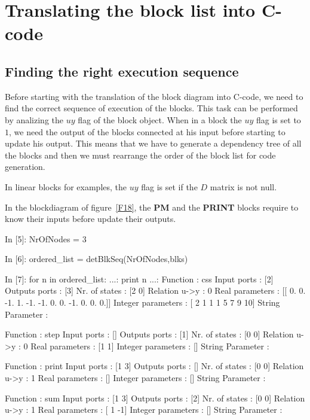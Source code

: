 \section{Translating the block list into C-code}
\subsection{Finding the right execution sequence}
Before starting with the translation of the block diagram into C-code, we need 
to find the correct sequence of execution of the blocks. This task can be 
performed by analizing the $uy$ flag of the block object. 
When in a block the $uy$ flag is set to $1$, we need the output of the blocks 
connected at his input before starting to update his output.
This means that we have to generate a dependency tree of all the blocks and 
then we must rearrange the order of the block list for code generation.

In linear blocks for examples, the $uy$ flag is set if the $D$ matrix is not 
null.

In the blockdiagram of figure~\ref{F18}, the \textbf{PM} and the 
\textbf{PRINT} blocks require to know their inputs before update their 
outputs.

\begin{code}
In [5]: NrOfNodes = 3

In [6]: ordered_list = detBlkSeq(NrOfNodes,blks)

In [7]: for n in ordered_list:
   ...:     print n
   ...:     
Function           : css
Input ports        : [2]
Outputs ports      : [3]
Nr. of states      : [2 0]
Relation u->y      : 0
Real parameters    : [[ 0.  0. -1.  1. -1. -1.  
                        0.  0. -1.  0.  0.  0.]]
Integer parameters : [ 2  1  1  1  5  7  9 10]
String Parameter   : 

Function           : step
Input ports        : []
Outputs ports      : [1]
Nr. of states      : [0 0]
Relation u->y      : 0
Real parameters    : [1 1]
Integer parameters : []
String Parameter   : 

Function           : print
Input ports        : [1 3]
Outputs ports      : []
Nr. of states      : [0 0]
Relation u->y      : 1
Real parameters    : []
Integer parameters : []
String Parameter   : 

Function           : sum
Input ports        : [1 3]
Outputs ports      : [2]
Nr. of states      : [0 0]
Relation u->y      : 1
Real parameters    : [ 1 -1]
Integer parameters : []
String Parameter   : 
\end{code}

